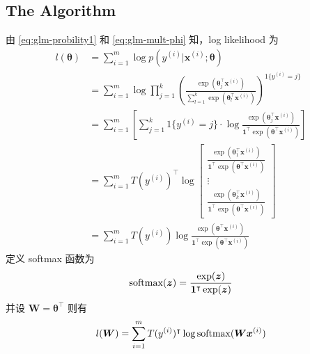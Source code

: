 		\subsection{The Algorithm}
			由 \eqref{eq:glm-probility1} 和 \eqref{eq:glm-mult-phi} 知，log likelihood 为
			\begin{align*}
				l(\bm{\theta}) &= \sum_{i=1}^{m} \log p(y^{(i)} | \bm{x}^{(i)} ; \bm{\theta} ) \\
				&= \sum_{i=1}^{m} \log \prod_{j=1}^{k} \left( \frac{ \exp(\bm{\theta}_j^\intercal \bm{x}^{(i)}) }{ \sum_{l=1}^{k} \exp \left( \bm{\theta}_l^\intercal \bm{x}^{(i)} \right) } \right)^{1\{y^{(i)}=j\}} \\
				&= \sum_{i=1}^{m} \left[ \sum_{j=1}^{k} 1\{y^{(i)}=j\} \cdot \log \frac {\exp(\bm{\theta}_j^\intercal \bm{x}^{(i)})} {\bm{1}^\intercal \exp(\bm{\theta}^\intercal \bm{x}^{(i)}) } \right] \\
				&= \sum_{i=1}^{m} T(y^{(i)})^\intercal \log
				\begin{bmatrix}
					\frac {\exp(\bm{\theta}_1^\intercal \bm{x}^{(i)})} {\bm{1}^\intercal \exp(\bm{\theta}^\intercal \bm{x}^{(i)}) } \\
					\vdots \\
					\frac {\exp(\bm{\theta}_k^\intercal \bm{x}^{(i)})} {\bm{1}^\intercal \exp(\bm{\theta}^\intercal \bm{x}^{(i)}) }
				\end{bmatrix} \\
				&= \sum_{i=1}^{m} T(y^{(i)}) \log \frac {\exp(\bm{\theta}^\intercal \bm{x}^{(i)})} {\bm{1}^\intercal \exp(\bm{\theta}^\intercal \bm{x}^{(i)}) } 
			\end{align*}
			定义 softmax 函数为
			\begin{equation}
				\text{softmax}(\bm{z}) = \frac {\exp(\bm{z})} {\bm{1}^\intercal \exp(\bm{z}) } 
			\end{equation}
			并设 $ \bm{W} = \bm{\theta}^\intercal $ 则有
			\begin{equation}
				l(\bm{W}) = \sum_{i=1}^{m} T(y^{(i)})^\intercal \log \text{softmax}(\bm{W} \bm{x}^{(i)})
			\end{equation}
			
